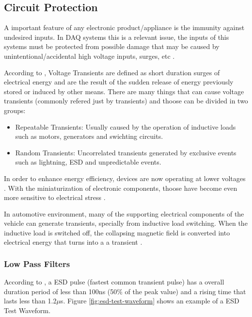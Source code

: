 \subsection{Circuit Protection}\label{ssec:circuitProtection}
	A important feature of any electronic product/appliance is the immunity against undesired inputs. In DAQ systems this is a relevant issue, the inputs of this systems must be protected from possible damage that may be caused by unintentional/accidental high voltage inputs, surges, etc \cite{mathivanan2007pc}.
	\par
	According to \cite{littlelFuseWhatIsTransientVoltage}, Voltage Transients are defined as short duration surges of electrical energy and are the result of the sudden release of energy previously stored or induced by other means. There are many things that can cause voltage transients (commonly refered just by transients) and thoose can be divided in two groups:

	\begin{itemize}
		\item Repeatable Transients: Usually caused by the operation of inductive loads such as motors, generators and swichting circuits.\label{itm:repeatable-transients}
		\item Random Transients: Uncorrelated transients generated by exclusive events such as lightning, ESD and unpredictable events.\label{itm:random-transients}
	\end{itemize}

	In order to enhance energy efficiency, devices are now operating at lower voltages \cite{xavier2017benefits}. With the miniaturization of electronic components, thoose have become even more sensitive to electrical stress \cite{littlelFuseWhatIsTransientVoltage}.
	\par
	In automotive environment, many of the supporting electrical components of the vehicle can generate transients, specially from inductive load switching. When the inductive load is switched off, the collapsing magnetic field is converted into electrical energy that turns into a a transient \cite{littlelFuseWhatIsTransientVoltage}.

	\subsubsection{Low Pass Filters}\label{sssec:lowPassFilterTransientProtection}
		According to \cite{littlelFuseWhatIsTransientVoltage}, a ESD pulse (fastest common transient pulse) has a overall duration period of less than 100ns (50$\%$ of the peak value) and a rising time that lasts less than 1.2$\mu$s. Figure \ref{fig:esd-test-waveform} shows an example of a ESD Test Waveform.

